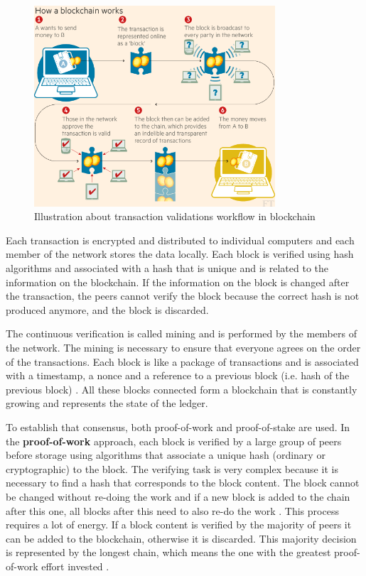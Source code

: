  \begin{figure}[h]
\centering
\includegraphics[width=0.8\textwidth]{./Images/ft}
\caption{Illustration about transaction validations workflow in blockchain}
\label{fig:bc}
\end{figure}


Each transaction is encrypted and distributed to individual computers and each member of the network stores the data locally. Each block is verified using hash algorithms and associated with a hash that is unique and is related to the information on the blockchain. If the information on the block is changed after the transaction, the peers cannot verify the block because the correct hash is not produced anymore, and the block is discarded.



The continuous verification is called mining and is performed by the members of the network. The mining is necessary to ensure that everyone agrees on the order of the transactions. Each block is like a package of transactions and is associated with a timestamp, a nonce and a reference to a previous block (i.e. hash of the previous block) \cite{bitcoin}. All these blocks connected form a blockchain that is constantly growing and represents the state of the ledger.


To establish that consensus, both proof-of-work and proof-of-stake are used.
In the \textbf{proof-of-work} approach, each block is verified by a large group of peers before storage using algorithms that associate a unique hash (ordinary or cryptographic) to the block. The verifying task is very complex because it is necessary to find a hash that corresponds to the block content. The block cannot be changed without re-doing the work and if a new block is added to the chain after this one, all blocks after this need to also re-do the work \cite{bitcoin}. This process requires a lot of energy. If a block content is verified by the majority of peers it can be added to the blockchain, otherwise it is discarded. This majority decision is represented by the longest chain, which means the one with the greatest proof-of-work effort invested \cite{bitcoin}. 



